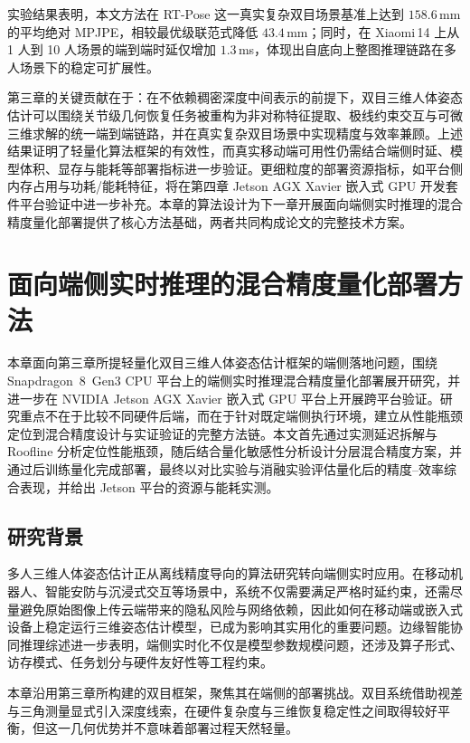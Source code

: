 实验结果表明，本文方法在 RT-Pose 这一真实复杂双目场景基准上达到 $158.6$\,mm 的平均绝对 MPJPE，相较最优级联范式降低 $43.4$\,mm；同时，在 Xiaomi\,14 上从 1 人到 10 人场景的端到端时延仅增加 $1.3$\,ms，体现出自底向上整图推理链路在多人场景下的稳定可扩展性。

第三章的关键贡献在于：在不依赖稠密深度中间表示的前提下，双目三维人体姿态估计可以围绕关节级几何恢复任务被重构为非对称特征提取、极线约束交互与可微三维求解的统一端到端链路，并在真实复杂双目场景中实现精度与效率兼顾。上述结果证明了轻量化算法框架的有效性，而真实移动端可用性仍需结合端侧时延、模型体积、显存与能耗等部署指标进一步验证。更细粒度的部署资源指标，如平台侧内存占用与功耗/能耗特征，将在第四章 Jetson AGX Xavier 嵌入式 GPU 开发套件平台验证中进一步补充。本章的算法设计为下一章开展面向端侧实时推理的混合精度量化部署提供了核心方法基础，两者共同构成论文的完整技术方案。
\newpage
\section{面向端侧实时推理的混合精度量化部署方法}

本章面向第三章所提轻量化双目三维人体姿态估计框架的端侧落地问题，围绕 Snapdragon~8~Gen3 CPU 平台上的端侧实时推理混合精度量化部署展开研究，并进一步在 NVIDIA Jetson AGX Xavier 嵌入式 GPU 平台上开展跨平台验证。研究重点不在于比较不同硬件后端，而在于针对既定端侧执行环境，建立从性能瓶颈定位到混合精度设计与实证验证的完整方法链。本文首先通过实测延迟拆解与 Roofline 分析定位性能瓶颈，随后结合量化敏感性分析设计分层混合精度方案，并通过后训练量化完成部署，最终以对比实验与消融实验评估量化后的精度--效率综合表现，并给出 Jetson 平台的资源与能耗实测。

\subsection{研究背景}
多人三维人体姿态估计正从离线精度导向的算法研究转向端侧实时应用。在移动机器人、智能安防与沉浸式交互等场景中，系统不仅需要满足严格时延约束，还需尽量避免原始图像上传云端带来的隐私风险与网络依赖，因此如何在移动端或嵌入式设备上稳定运行三维姿态估计模型，已成为影响其实用化的重要问题。边缘智能协同推理综述进一步表明，端侧实时化不仅是模型参数规模问题，还涉及算子形式、访存模式、任务划分与硬件友好性等工程约束。

本章沿用第三章所构建的双目框架，聚焦其在端侧的部署挑战。双目系统借助视差与三角测量显式引入深度线索，在硬件复杂度与三维恢复稳定性之间取得较好平衡，但这一几何优势并不意味着部署过程天然轻量。

